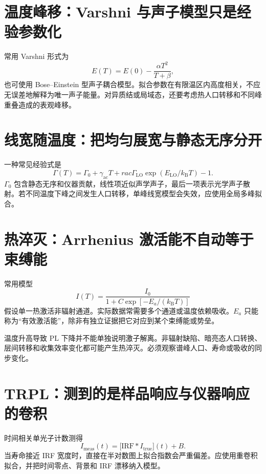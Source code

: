 \documentclass[11pt,a4paper,openany,fontset=fandol]{ctexbook}
\begin{document}
\section{温度峰移：Varshni 与声子模型只是经验参数化}

常用 Varshni 形式为
\[
E(T)=E(0)-\frac{\alpha T^2}{T+\beta},
\]
也可使用 Bose--Einstein 型声子耦合模型。拟合参数在有限温区内高度相关，不应无误差地解释为唯一声子能量。对异质结或局域态，还要考虑热人口转移和不同峰重叠造成的表观峰移。

\section{线宽随温度：把均匀展宽与静态无序分开}

一种常见经验式是
\[
\Gamma(T)=\Gamma_0+\gamma_{\mathrm{ac}}T+rac{\Gamma_{\mathrm{LO}}}{\exp(E_{\mathrm{LO}}/k_{\mathrm B}T)-1}.
\]
$\Gamma_0$ 包含静态无序和仪器贡献，线性项近似声学声子，最后一项表示光学声子散射。若不同温度下峰之间发生人口转移，单峰线宽模型会失效，应使用全局多峰拟合。

\section{热淬灭：Arrhenius 激活能不自动等于束缚能}

常用模型
\[
I(T)=\frac{I_0}{1+C\exp[-E_a/(k_{\mathrm B}T)]}
\]
假设单一热激活非辐射通道。实际数据常需要多个通道或温度依赖吸收。$E_a$ 只能称为“有效激活能”，除非有独立证据把它对应到某个束缚能或势垒。

\begin{warningbox}
温度升高导致 PL 下降并不能单独说明激子解离。非辐射缺陷、暗亮态人口转换、层间转移和收集效率变化都可能产生热淬灭。必须观察谱峰人口、寿命或吸收的同步变化。
\end{warningbox}

\section{TRPL：测到的是样品响应与仪器响应的卷积}

时间相关单光子计数测得
\[
I_{\mathrm{meas}}(t)=\bigl[\mathrm{IRF}*I_{\mathrm{true}}\bigr](t)+B.
\]
当寿命接近 IRF 宽度时，直接在半对数图上拟合指数会严重偏差。应使用重卷积拟合，并把时间零点、背景和 IRF 漂移纳入模型。
\end{document}
